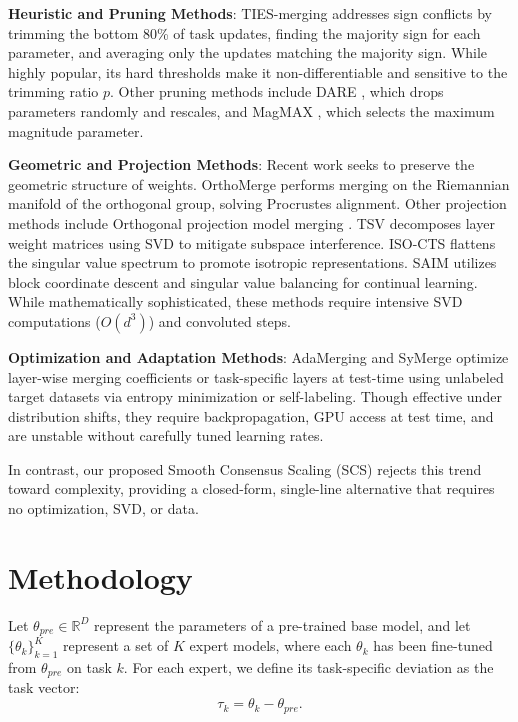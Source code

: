 \documentclass{article}
\theoremstyle{plain}
\theoremstyle{definition}
\theoremstyle{remark}
\begin{document}
\textbf{Heuristic and Pruning Methods}: TIES-merging \cite{Yadav2024} addresses sign conflicts by trimming the bottom 80\% of task updates, finding the majority sign for each parameter, and averaging only the updates matching the majority sign. While highly popular, its hard thresholds make it non-differentiable and sensitive to the trimming ratio $p$. Other pruning methods include DARE \cite{Kempf2023}, which drops parameters randomly and rescales, and MagMAX \cite{Marczak2024}, which selects the maximum magnitude parameter.

\textbf{Geometric and Projection Methods}: Recent work seeks to preserve the geometric structure of weights. OrthoMerge \cite{OrthoMerge} performs merging on the Riemannian manifold of the orthogonal group, solving Procrustes alignment. Other projection methods include Orthogonal projection model merging \cite{Tang2025}. TSV \cite{Gargiulo2025} decomposes layer weight matrices using SVD to mitigate subspace interference. ISO-CTS \cite{Marczak2025a} flattens the singular value spectrum to promote isotropic representations. SAIM \cite{SAIM} utilizes block coordinate descent and singular value balancing for continual learning. While mathematically sophisticated, these methods require intensive SVD computations ($O(d^3)$) and convoluted steps.

\textbf{Optimization and Adaptation Methods}: AdaMerging \cite{Yang2024b} and SyMerge \cite{SyMerge} optimize layer-wise merging coefficients or task-specific layers at test-time using unlabeled target datasets via entropy minimization or self-labeling. Though effective under distribution shifts, they require backpropagation, GPU access at test time, and are unstable without carefully tuned learning rates.

In contrast, our proposed Smooth Consensus Scaling (SCS) rejects this trend toward complexity, providing a closed-form, single-line alternative that requires no optimization, SVD, or data.

\section{Methodology}
\label{sec:method}
Let $\theta_{pre} \in \mathbb{R}^D$ represent the parameters of a pre-trained base model, and let $\{\theta_k\}_{k=1}^K$ represent a set of $K$ expert models, where each $\theta_k$ has been fine-tuned from $\theta_{pre}$ on task $k$. For each expert, we define its task-specific deviation as the task vector:
\begin{equation}
    \tau_k = \theta_k - \theta_{pre}.
\end{equation}
\end{document}
